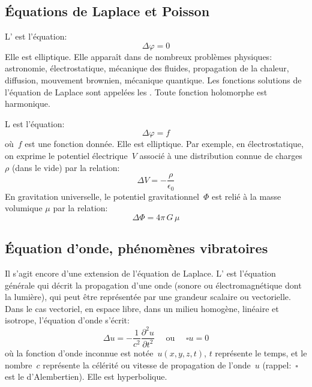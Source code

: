 \medskip
\subsection{Équations de Laplace et Poisson}
L' est l'équation:
\begin{equation}\Delta \varphi=0\end{equation}
Elle est elliptique. 
\medskipvm
Elle apparaît dans de nombreux problèmes physiques: astronomie, électrostatique, mécanique des fluides, propagation de la chaleur, diffusion, mouvement brownien, mécanique quantique.
\medskipvm
Les fonctions solutions de l'équation de Laplace sont appelées les . Toute fonction holomorphe est harmonique.

\medskip
L est l'équation:
\begin{equation}\Delta \varphi=f\end{equation}
où~$f$ est une fonction donnée. Elle est elliptique.
\medskipvm
Par exemple, en électrostatique, on exprime le potentiel électrique~$V$ associé à une distribution connue de charges~$\rho$ (dans le vide) par la relation:
\begin{equation}
  \Delta V = - \dfrac{\rho}{\epsilon_0}
\end{equation}
En gravitation universelle, le potentiel gravitationnel~$\Phi$ est relié à la masse volumique $\mu$ par la relation:
\begin{equation}
\Delta \Phi = 4 \pi \, G \, \mu 
\end{equation}

\medskip
\subsection{Équation d'onde, phénomènes vibratoires}
Il s'agit encore d'une extension de l'équation de Laplace.
\medskipvm
L' est l'équation générale qui décrit la propagation d'une onde (sonore ou électromagnétique dont la lumière), qui peut être représentée par une grandeur scalaire ou vectorielle.
\medskipvm
Dans le cas vectoriel, en espace libre, dans un milieu homogène, linéaire et isotrope, l'équation d'onde s'écrit:
\begin{equation}
  \Delta u = - \frac1{c^2} \dfrac{\partial^2 u}{\partial t^2} \quad \text{ ou } \quad \square u =0
\end{equation}
où la fonction d'onde inconnue est notée~$u(x,y,z,t)$, $t$ représente le temps, et le nombre~$c$ représente la célérité ou vitesse de propagation de l'onde~$u$ (rappel:~$\square$ est le d'Alembertien). Elle est hyperbolique.

